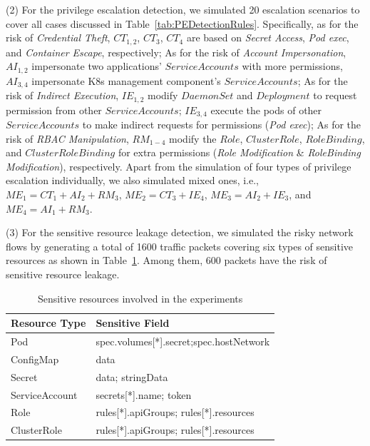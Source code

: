 \documentclass[conference]{IEEEtran}
\theoremstyle{definition}
\begin{document}
(2) For the privilege escalation detection, we simulated  20 escalation scenarios to cover all cases discussed in Table~\ref{tab:PEDetectionRules}. Specifically, as for the risk of \textit{Credential Theft}, $CT_{1,2}$, $CT_{3}$, $CT_{4}$ are based on \textit{Secret Access}, \textit{Pod exec}, and \textit{Container Escape}, respectively; 
As for the risk of \textit{Account Impersonation}, $AI_{1,2}$ impersonate two applications' $ServiceAccounts$ with more permissions, $AI_{3,4}$ impersonate K8s management component's $ServiceAccounts$;
As for the risk of \textit{Indirect Execution}, $IE_{1,2}$ modify $DaemonSet$ and $Deployment$ to request permission from other $ServiceAccounts$; $IE_{3,4}$ execute the pods of other $ServiceAccounts$ to make indirect requests for permissions (\textit{Pod exec});
As for the risk of \textit{RBAC Manipulation}, $RM_{1-4}$ modify the $Role$, $ClusterRole$, $RoleBinding$, and $ClusterRoleBinding$ for extra permissions (\textit{Role Modification} \& \textit{RoleBinding Modification}), respectively. 
Apart from the simulation of four types of privilege escalation individually, we also simulated mixed ones, i.e., $ME_1 = CT_1 + AI_2 + RM_3 $, $ME_2 = CT_3 + IE_4$, $ME_3 = AI_2 + IE_3$, and $ME_4 = AI_1 + RM_3$.

(3) For the sensitive resource leakage detection, we simulated the risky network flows by generating a total of 1600 traffic packets covering six types of sensitive resources as shown in Table~\ref{tab:sensitiveresource}. Among them, 600 packets have the risk of sensitive resource leakage. 

\vspace{-6pt}
\begin{table}[!htb]
    \centering
    \caption{Sensitive resources involved in the experiments}
    \begin{tabular}{ll}
        \hline
        Resource Type & Sensitive Field \\ \hline
        Pod & spec.volumes[*].secret;spec.hostNetwork\\
        ConfigMap & data \\
        Secret & data; stringData \\
        ServiceAccount & secrets[*].name; token \\
        Role & rules[*].apiGroups; rules[*].resources \\
        ClusterRole & rules[*].apiGroups; rules[*].resources \\
        \hline
    \end{tabular}
    \label{tab:sensitiveresource}
\end{table}
\vspace{-6pt}
\end{document}
